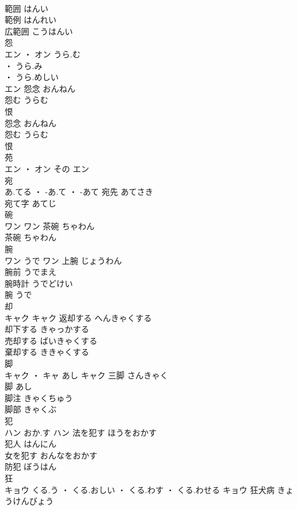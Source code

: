 \documentclass[8pt]{extreport}
\begin{document}
\begin{CJK}{UTF8}{min}
\\	範囲	はんい	
\\	範例	はんれい	
\\	広範囲	こうはんい	
\\	怨	
\\	エン ・ オン	うら.む
\\	・ うら.み
\\	・ うら.めしい
\\	エン	怨念	おんねん	
\\	怨む	うらむ	
\\	恨 
\\	怨念	おんねん	
\\	怨む	うらむ	
\\	恨 
\\	苑	
\\	エン ・ オン	その	エン																																			
\\	宛	
\\	あ.てる ・ -あ.て ・ -あて		宛先	あてさき	
\\	宛て字	あてじ	
\\	碗	
\\	ワン		ワン	茶碗	ちゃわん	
\\	茶碗	ちゃわん	
\\	腕	
\\	ワン	うで	ワン	上腕	じょうわん	
\\	腕前	うでまえ	
\\	腕時計	うでどけい	
\\	腕	うで	
\\	却	
\\	キャク		キャク	返却する	へんきゃくする	
\\	却下する	きゃっかする	
\\	売却する	ばいきゃくする	
\\	棄却する	ききゃくする	
\\	脚	
\\	キャク ・ キャ	あし	キャク	三脚	さんきゃく	
\\	脚	あし	
\\	脚注	きゃくちゅう	
\\	脚部	きゃくぶ	
\\	犯	
\\	ハン	おか.す	ハン	法を犯す	ほうをおかす	
\\	犯人	はんにん	
\\	女を犯す	おんなをおかす	
\\	防犯	ぼうはん	
\\	狂	
\\	キョウ	くる.う ・ くる.おしい ・ くる.わす ・ くる.わせる	キョウ	狂犬病	きょうけんびょう	

\end{CJK}
\end{document}
